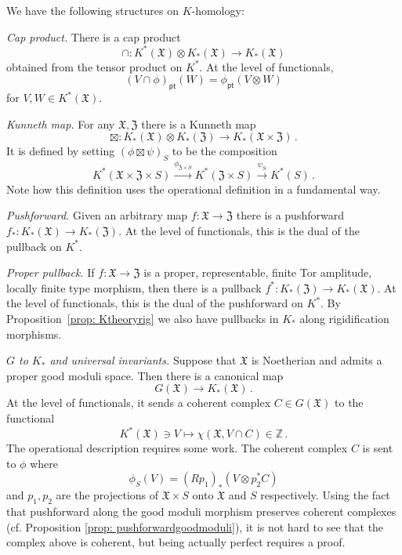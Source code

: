 \documentclass[12pt]{amsart}
\theoremstyle{definition}
\newcommand{\BZ}{{\mathbb{Z}}}
\newcommand{\1}{\mathbf 1}
\newcommand{\FX}{{\mathfrak{X}}}
\newcommand{\FY}{\mathfrak{Z}}
\newcommand{\pt}{{\mathsf{pt}}}
\begin{document}
We have the following structures on $K$-homology:

\textit{Cap product.} There is a cap product
    \[\cap\colon K^\ast(\FX)\otimes K_\ast(\FX)\to K_\ast(\FX)\]
    obtained from the tensor product on $K^\ast$. At the level of functionals, 
    \[(V\cap \phi)_\pt(W)=\phi_\pt(V\otimes W)\]
    for $V, W\in K^\ast(\FX)$.
    
\textit{Kunneth map.} For any $\FX, \FY$ there is a Kunneth map
    \[\boxtimes \colon K_\ast(\FX)\otimes K_\ast(\FY)\to K_\ast(\FX\times \FY)\,.\]
    It is defined by setting $(\phi\boxtimes \psi)_S$ to be the composition
    \[K^\ast(\FX\times \FY\times S)\xrightarrow{\phi_{\FY\times S}} K^\ast(\FY\times S) \xrightarrow{\psi_{S}} K^\ast(S)\,.\]
Note how this definition uses the operational definition in a fundamental way.

\textit{Pushforward.} Given an arbitrary map $f\colon \FX\to \FY$ there is a pushforward $f_\ast\colon K_\ast(\FX)\to K_\ast(\FY)$. At the level of functionals, this is the dual of the pullback on $K^\ast$.

\textit{Proper pullback.} If $f \colon \FX\to \FY$ is a proper, representable, finite Tor amplitude, locally finite type morphism, then there is a pullback $f^\ast\colon K_\ast(\FY)\to K_\ast(\FX)$. At the level of functionals, this is the dual of the pushforward on $K^\ast$. By Proposition~\ref{prop: Ktheoryrig} we also have pullbacks in $K_\ast$ along rigidification morphisms.

\textit{$G$ to $K_\ast$ and universal invariants.} Suppose that $\FX$ is Noetherian and admits a proper good moduli space. Then there is a canonical map
    \begin{equation}\label{eq: GtoKmorphism}
   G(\FX)\to K_\ast(\FX)\,. \end{equation}
At the level of functionals, it sends a coherent complex $C\in G(\FX)$ to the functional
    \[K^\ast(\FX)\ni V\mapsto \chi(\FX, V\cap C)\in \BZ\,.\]
The operational description requires some work. The coherent complex $C$ is sent to $\phi$ where 
\[\phi_S(V)=(Rp_{1})_\ast (V\otimes p_2^\ast C)\]
and $p_1, p_2$ are the projections of $\FX\times S$ onto $\FX$ and $S$ respectively. Using the fact that pushforward along the good moduli morphism preserves coherent complexes (cf. Proposition \ref{prop: pushforwardgoodmoduli}), it is not hard to see that the complex above is coherent, but being actually perfect requires a proof.
\end{document}
